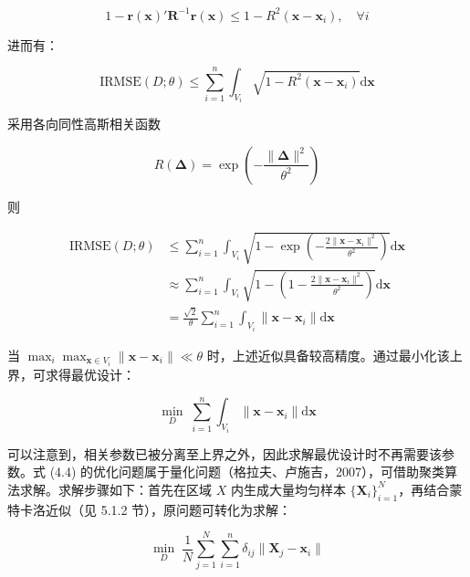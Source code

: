 \documentclass{ctexart}
\begin{document}
\begin{equation*}
1-\boldsymbol{r}(\boldsymbol{x})'\boldsymbol{R}^{-1}\boldsymbol{r}(\boldsymbol{x})\le1-R^2(\boldsymbol{x}-\boldsymbol{x}_i),\quad\forall i
\tag{4.2}
\end{equation*}

进而有：

\begin{equation*}
\mathrm{IRMSE}(D;\theta)\le\sum_{i=1}^n\int_{V_i}\sqrt{1-R^2(\boldsymbol{x}-\boldsymbol{x}_i)}\mathrm{d}\boldsymbol{x}
\end{equation*}

采用各向同性高斯相关函数

\begin{equation*}
R(\boldsymbol{\Delta})=\exp\left(-\frac{\|\boldsymbol{\Delta}\|^2}{\theta^2}\right)
\tag{4.3}
\end{equation*}

则

\begin{align*}
\mathrm{IRMSE}(D;\theta)&\le\sum_{i=1}^n\int_{V_i}\sqrt{1-\exp\left(-\frac{2\|\boldsymbol{x}-\boldsymbol{x}_i\|^2}{\theta^2}\right)}\mathrm{d}\boldsymbol{x}\\
&\approx\sum_{i=1}^n\int_{V_i}\sqrt{1-\left(1-\frac{2\|\boldsymbol{x}-\boldsymbol{x}_i\|^2}{\theta^2}\right)}\mathrm{d}\boldsymbol{x}\\
&=\frac{\sqrt{2}}{\theta}\sum_{i=1}^n\int_{V_i}\|\boldsymbol{x}-\boldsymbol{x}_i\|\mathrm{d}\boldsymbol{x}
\end{align*}

当 $\max_i\max_{\boldsymbol{x}\in V_i}\|\boldsymbol{x}-\boldsymbol{x}_i\|\ll\theta$ 时，上述近似具备较高精度。通过最小化该上界，可求得最优设计：

\begin{equation*}
\min_{D}\;\sum_{i=1}^n\int_{V_i}\|\boldsymbol{x}-\boldsymbol{x}_i\|\mathrm{d}\boldsymbol{x}
\tag{4.4}
\end{equation*}

可以注意到，相关参数已被分离至上界之外，因此求解最优设计时不再需要该参数。式 (4.4) 的优化问题属于量化问题（格拉夫、卢施吉，2007），可借助聚类算法求解。求解步骤如下：首先在区域 $X$ 内生成大量均匀样本 $\{\boldsymbol{X}_i\}_{i=1}^N$，再结合蒙特卡洛近似（见 5.1.2 节），原问题可转化为求解：

\begin{equation*}
\min_{D}\;\frac{1}{N}\sum_{j=1}^N\sum_{i=1}^n\delta_{ij}\|\boldsymbol{X}_j-\boldsymbol{x}_i\|
\tag{4.5}
\end{equation*}
\end{document}

